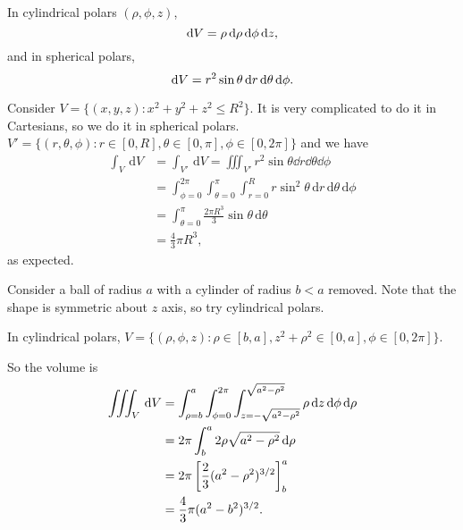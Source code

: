 \begin{example}
    In cylindrical polars $ (\rho,\phi,z) $, 
    \[
        \mathrm{d} V= \rho\,\mathrm{d}\rho \,\mathrm{d} \phi\,\mathrm{d} z,
    \]
    and in spherical polars, 
    \[
        \mathrm{d} V = r^2 \sin \theta\,\mathrm{d} r\,\mathrm{d} \theta \,\mathrm{d} \phi.
    \]
\end{example}
\begin{example}
    Consider $ V=\{(x,y,z):x^2+y^2+z^2\le R^2\} $. It is very complicated to do it in Cartesians, so we do it in spherical polars. $V'= \{(r,\theta,\phi): r\in[0,R], \theta\in [0,\pi],\phi\in [0,2\pi]\} $ and we have 
    \begin{align*}
        \int_{V} \,\mathrm{d}V &= \int_{V'} \,\mathrm{d}V = \iiint_{V'}r^2 \sin \theta\dd r\dd \theta\dd \phi\\ 
        &= \int_{\phi=0}^{2\pi}\int_{\theta=0}^{\pi}\int_{r=0}^{R} r \sin^2\theta \,\mathrm{d}r \,\mathrm{d}\theta \,\mathrm{d}\phi \\ 
        &= \int_{\theta=0}^{\pi} \frac{2\pi R^3}{3}\sin \theta \,\mathrm{d}\theta\\ 
        &=\frac{4}{3}\pi R^3,
    \end{align*}
    as expected.
\end{example}
\begin{example}
    Consider a ball of radius $a$ with a cylinder of radius $b<a$ removed. Note that the shape is symmetric about $z$ axis, so try cylindrical polars.
    \begin{center}
    \end{center}
    In cylindrical polars, $ V=\{(\rho,\phi,z): \rho\in [b,a],z^2+\rho^2\in[0,a],\phi\in [0,2\pi]\} $.

    So the volume is
    \begin{align*}
        \iiint_V \,\mathrm{d} V &= \int_{\rho=b}^a\int_{\phi=0}^{2\pi}\int_{z=-\sqrt{a^2 - \rho^2}}^{\sqrt{a^2 - \rho^2}}\rho\,\mathrm{d} z\,\mathrm{d} \phi\,\mathrm{d} \rho \\
        &= 2\pi\int_b^a 2\rho\sqrt{a^2 - \rho^2}\,\mathrm{d} \rho\\
        &= 2\pi \left[\frac{2}{3}(a^2 - \rho^2)^{3/2}\right]^a_b\\
        &= \frac{4}{3}\pi (a^2 - b^2)^{3/2}.
    \end{align*}
\end{example}

